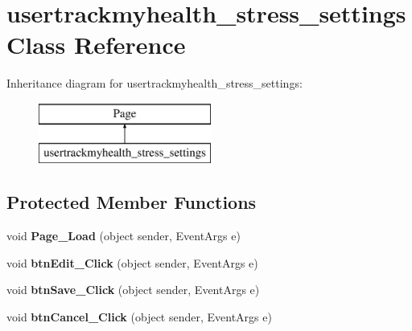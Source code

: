 \hypertarget{classusertrackmyhealth__stress__settings}{\section{usertrackmyhealth\-\_\-stress\-\_\-settings Class Reference}
\label{classusertrackmyhealth__stress__settings}
}
Inheritance diagram for usertrackmyhealth\-\_\-stress\-\_\-settings\-:\begin{figure}[H]
\begin{center}
\leavevmode
\includegraphics[height=2.000000cm]{classusertrackmyhealth__stress__settings}
\end{center}
\end{figure}
\subsection*{Protected Member Functions}
\begin{DoxyCompactItemize}
\item 
\hypertarget{classusertrackmyhealth__stress__settings_acd9bd8e8216a34720c28006f2c9553e1}{void {\bfseries Page\-\_\-\-Load} (object sender, Event\-Args e)}\label{classusertrackmyhealth__stress__settings_acd9bd8e8216a34720c28006f2c9553e1}

\item 
\hypertarget{classusertrackmyhealth__stress__settings_a83eb0cd2a47656377edb12aab57780ce}{void {\bfseries btn\-Edit\-\_\-\-Click} (object sender, Event\-Args e)}\label{classusertrackmyhealth__stress__settings_a83eb0cd2a47656377edb12aab57780ce}

\item 
\hypertarget{classusertrackmyhealth__stress__settings_abab38153be882a05a7611f366a6d6980}{void {\bfseries btn\-Save\-\_\-\-Click} (object sender, Event\-Args e)}\label{classusertrackmyhealth__stress__settings_abab38153be882a05a7611f366a6d6980}

\item 
\hypertarget{classusertrackmyhealth__stress__settings_ad805f128a4bc1bb18918df06c236a1c2}{void {\bfseries btn\-Cancel\-\_\-\-Click} (object sender, Event\-Args e)}\label{classusertrackmyhealth__stress__settings_ad805f128a4bc1bb18918df06c236a1c2}

\end{DoxyCompactItemize}



